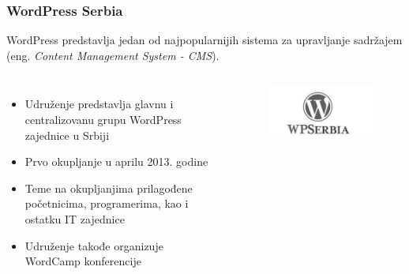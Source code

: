 \documentclass[hyperref={bookmarks=false},aspectratio=169]{beamer}
\begin{document}
\begin{frame}
\frametitle{WordPress Serbia}

WordPress predstavlja jedan od najpopularnijih sistema za upravljanje sadržajem (eng. \emph{Content Management System - CMS}).

\begin{columns}[T]
\begin{itemize}
    \item Udruženje predstavlja glavnu i centralizovanu grupu WordPress zajednice u Srbiji
    \item Prvo okupljanje u aprilu 2013. godine
    \item Teme na okupljanjima prilagođene početnicima, programerima, kao i ostatku IT zajednice
    \item Udruženje takođe organizuje WordCamp konferencije
\end{itemize}



\begin{figure}
    \raggedleft
    \includegraphics[scale=0.4]{./images/wp.jpg}
\end{figure}

\end{columns}
\end{frame}
\end{document}
